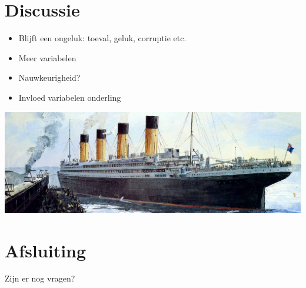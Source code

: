 \documentclass[11pt]{article}
\begin{document}
\section*{Discussie}
\label{sec:orgff7f7ea}
\begin{itemize}
\item Blijft een ongeluk: toeval, geluk, corruptie etc.
\item Meer variabelen
\item Nauwkeurigheid?
\item Invloed variabelen onderling
\end{itemize}


\begin{center}
\includegraphics[width=600]{./titanic3.png}
\end{center}
\section*{Afsluiting}
\label{sec:org6444e3d}
Zijn er nog vragen? 
\end{document}

